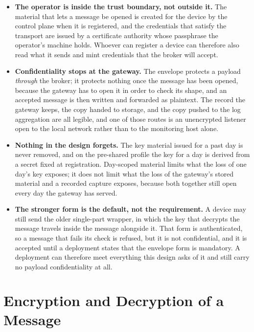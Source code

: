 \documentclass[12pt,a4paper]{report}
\begin{document}
\begin{itemize}
    \item \textbf{The operator is inside the trust boundary, not outside
    it.} The material that lets a message be opened is created for the
    device by the control plane when it is registered, and the credentials
    that satisfy the transport are issued by a certificate authority whose
    passphrase the operator's machine holds. Whoever can register a device
    can therefore also read what it sends and mint credentials that the
    broker will accept.
    \item \textbf{Confidentiality stops at the gateway.} The envelope
    protects a payload \emph{through} the broker; it protects nothing once
    the message has been opened, because the gateway has to open it in
    order to check its shape, and an accepted message is then written and
    forwarded as plaintext. The record the gateway keeps, the copy handed
    to storage, and the copy pushed to the log aggregation are all legible,
    and one of those routes is an unencrypted listener open to the local
    network rather than to the monitoring host alone.
    \item \textbf{Nothing in the design forgets.} The key material issued
    for a past day is never removed, and on the pre-shared profile the key
    for a day is derived from a secret fixed at registration. Day-scoped
    material limits what the loss of one day's key exposes; it does not
    limit what the loss of the gateway's stored material and a recorded
    capture exposes, because both together still open every day the gateway
    has served.
    \item \textbf{The stronger form is the default, not the requirement.}
    A device may still send the older single-part wrapper, in which the key
    that decrypts the message travels inside the message alongside it. That
    form is authenticated, so a message that fails its check is refused,
    but it is not confidential, and it is accepted until a deployment
    states that the envelope form is mandatory. A deployment can therefore
    meet everything this design asks of it and still carry no payload
    confidentiality at all.
\end{itemize}

\section{Encryption and Decryption of a Message}
\label{sec:encryption-envelope}
\end{document}
